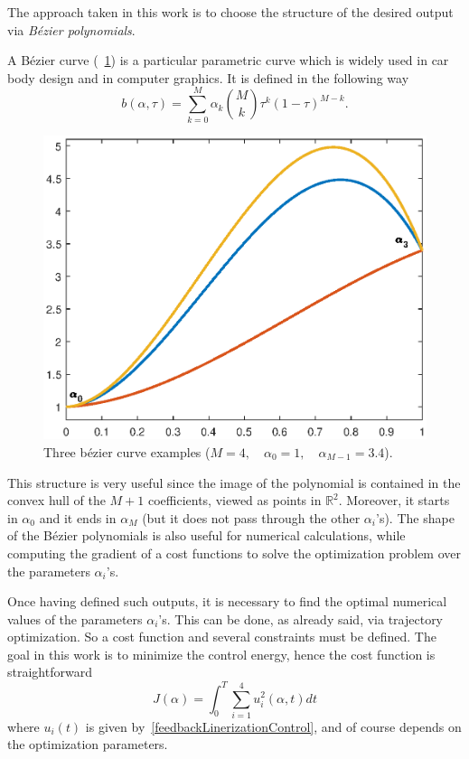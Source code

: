 \documentclass[11pt]{article}
\begin{document}
The approach taken in this work is to choose the structure of the desired output via \textit{Bézier polynomials}.

A Bézier curve (\figurename~\ref{bezierPlot}) is a particular parametric curve which is widely used in car body design and in computer graphics. It is defined in the following way
\begin{equation}
    b(\alpha,\tau) = \sum_{k=0}^M \alpha_k \binom{M}{k} \tau^k (1-\tau)^{M-k}.
    \label{bezierStructure}
\end{equation}

\begin{figure}[H]
\centering
\includegraphics[width=.6\textwidth]{Images/bezier.eps}
\caption{Three bézier curve examples ($M = 4, \quad \alpha_0 = 1, \quad \alpha_{M-1} = 3.4$).}
\label{bezierPlot}
\end{figure}

This structure is very useful since the image of the polynomial is contained in the convex hull of the $M+1$ coefficients, viewed as points in $\mathbb{R}^2$. Moreover, it starts in $\alpha_0$ and it ends in $\alpha_M$ (but it does not pass through the other $\alpha_i$'s). The shape of the Bézier polynomials is also useful for numerical calculations, while computing the gradient of a cost functions to solve the optimization problem over the parameters $\alpha_i$'s. 

Once having defined such outputs, it is necessary to find the optimal numerical values of the parameters $\alpha_i$'s. This can be done, as already said, via trajectory optimization. So a cost function and several constraints must be defined. The goal in this work is to minimize the control energy, hence the cost function is straightforward
\begin{equation}
    J(\alpha) = \int_0^T\sum_{i=1}^{4}u_i^2(\alpha,t) dt
    \label{costFcn}
\end{equation}
where $u_i(t)$ is given by~\eqref{feedbackLinerizationControl}, and of course depends on the optimization parameters. 
\end{document}
